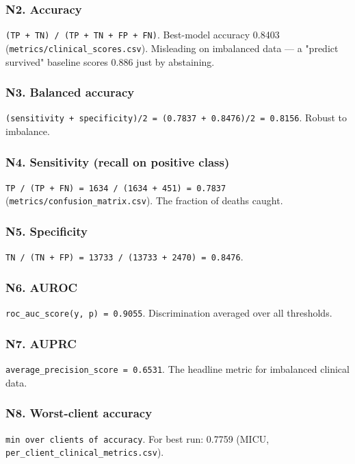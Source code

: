 \documentclass{article}
\begin{document}
\subsubsection{N2. Accuracy}


\texttt{(TP + TN) / (TP + TN + FP + FN)}. Best-model accuracy 0.8403 (\texttt{metrics/clinical\_scores.csv}). Misleading on imbalanced data --- a "predict survived" baseline scores 0.886 just by abstaining.


\subsubsection{N3. Balanced accuracy}


\texttt{(sensitivity + specificity)/2 = (0.7837 + 0.8476)/2 = 0.8156}. Robust to imbalance.


\subsubsection{N4. Sensitivity (recall on positive class)}


\texttt{TP / (TP + FN) = 1634 / (1634 + 451) = 0.7837} (\texttt{metrics/confusion\_matrix.csv}). The fraction of deaths caught.


\subsubsection{N5. Specificity}


\texttt{TN / (TN + FP) = 13733 / (13733 + 2470) = 0.8476}.


\subsubsection{N6. AUROC}


\texttt{roc\_auc\_score(y, p) = 0.9055}. Discrimination averaged over all thresholds.


\subsubsection{N7. AUPRC}


\texttt{average\_precision\_score = 0.6531}. The headline metric for imbalanced clinical data.


\subsubsection{N8. Worst-client accuracy}


\texttt{min over clients of accuracy}. For best run: 0.7759 (MICU, \texttt{per\_client\_clinical\_metrics.csv}).
\end{document}
